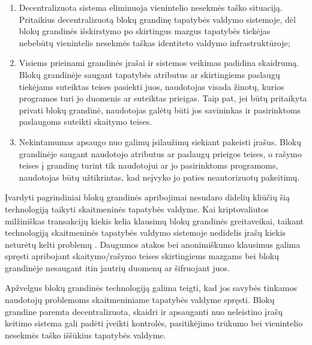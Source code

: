 \begin{enumerate}
    \item Decentralizuota sistema eliminuoja vienintelio nesekmės taško situaciją. Pritaikius decentralizuotą blokų grandinę
    tapatybės valdymo sistemoje, dėl blokų grandinės išskirstymo po skirtingus mazgus 
    tapatybės tiekėjas nebebūtų vienintelis nesekmės taškas identiteto valdymo infrastruktūroje;

    \item Visiems prieinami grandinės įrašai ir sistemos veikimas padidina skaidrumą. Blokų grandinėje saugant tapatybės atributus
    ar skirtingiems paslaugų tiekėjams suteiktas teises pasiekti juos, naudotojas visada žinotų, kurios programos turi jo duomenis ar suteiktas
    prieigas. Taip pat, jei būtų pritaikyta privati blokų grandinė, naudotojas galėtų būti jos savininkas ir pasirinktoms paslaugoms suteikti
    skaitymo teises.

    \item Nekintamumas apsaugo nuo galimų įsilaužimų siekiant pakeisti įrašus.
    Blokų grandinėje saugant naudotojo atributus ar paslaugų prieigos teises,
    o rašymo teises į grandinę turint tik naudotojui ar jo pasirinktoms programoms, naudotojas būtų užtikrintas, kad
    neįvyko jo paties neautorizuotų pakeitimų.

\end{enumerate}

Įvardyti pagrindiniai blokų grandinės apribojimai nesudaro didelių kliūčių šią technologiją taikyti skaitmeninės tapatybės valdyme. Kai 
kriptovaliutos milžiniškas transakcijų kiekis kelia klausimų blokų grandinės greitaveikai, taikant technologiją skaitmeninės tapatybės
valdymo sistemoje nedidelis įrašų kiekis neturėtų kelti problemų \cite{Lo2017}. Daugumos atakos bei anonimiškumo klausimus galima spręsti
apribojant skaitymo/rašymo teises skirtingiems mazgams bei blokų grandinėje nesaugant itin jautrių duomenų ar šifruojant juos.

Apžvelgus blokų grandinės technologiją galima teigti, kad jos savybės tinkamos naudotojų problemoms skaitmeniniame tapatybės
valdyme spręsti. Blokų grandine paremta decentralizuota, skaidri ir apsauganti nuo neleistino įrašų keitimo sistema gali padėti
įveikti kontrolės, pasitikėjimo trūkumo bei vienintelio nesekmės taško iššūkius tapatybės valdyme.

